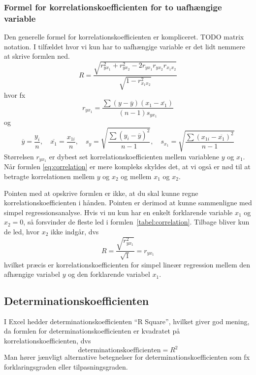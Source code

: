 \subsubsection{Formel for korrelationskoefficienten for to uafhængige variable}
Den generelle formel for korrelationskoefficienten er kompliceret. TODO matrix notation. I tilfældet hvor vi kun har to uafhængige variable er det lidt nemmere at skrive formlen ned.
\begin{displaymath}\label{eq:correlation}
  R = \frac{\sqrt{r^2_{yx_1} + r^2_{yx_2} - 2r_{yx_1} r_{yx_2} r_{{x_1}x_2}}}{\sqrt{1 - r^2_{{x_1}x_2}}}
\end{displaymath}
hvor fx
\begin{displaymath}
  r_{{y}{x_1}} = \frac{\sum{(y - \overbar{y})(x_1 - \overbar{x_1})}}{(n-1)s_{{y}{x_1}}}
\end{displaymath}
og
\begin{displaymath}
  \overbar{y} = \frac{y_{i}}{n}, \quad \overbar{x_1} = \frac{x_{1i}}{n}, \quad s_{y} = \sqrt{\frac{\sum{(y_{i} - \overbar{y})^2}}{n-1}}, \quad s_{x_1} = \sqrt{\frac{\sum{(x_{1i} - \overbar{x_1})^2}}{n-1}}
\end{displaymath}
Størrelsen \(r_{{y}{x_1}}\) er dybest set korrelationskoefficienten mellem variablene \(y\) og \(x_1\). Når formlen \ref{eq:correlation} er mere kompleks skyldes det, at vi også er nød til at betragte korrelationen mellem \(y\) og \(x_2\) og mellem \(x_1\) og \(x_2\).

Pointen med at opskrive formlen er ikke, at du skal kunne regne korrelationskoefficienten i hånden. Pointen er derimod at kunne sammenligne med simpel regressionsanalyse. Hvis vi nu kun har en enkelt forklarende variable \(x_1\) og \(x_2=0\), så forsvinder de fleste led i formlen~\ref{tabel:correlation}. Tilbage bliver kun de led, hvor \(x_2\) ikke indgår, dvs
\begin{displaymath}
  R = \frac{\sqrt{r^2_{yx_1}}}{\sqrt{1}} = r_{yx_1}
\end{displaymath}
hvilket præcis er korrelationskoefficienten for simpel lineær regression mellem den afhængige variabel \(y\) og den forklarende variabel \(x_1\).

\subsection{Determinationskoefficienten}
I Excel hedder determinationskoefficienten ``R Square'', hvilket giver god mening, da formlen for determinationskoefficienten er kvadratet på korrelationskoefficienten, dvs
\begin{displaymath}
\mathrm{determinationskoefficienten} = R^2
\end{displaymath}
Man hører jænvligt alternative betegnelser for determinationskoefficienten som fx for\-kla\-rings\-grad\-en eller tilpasningsgraden.

